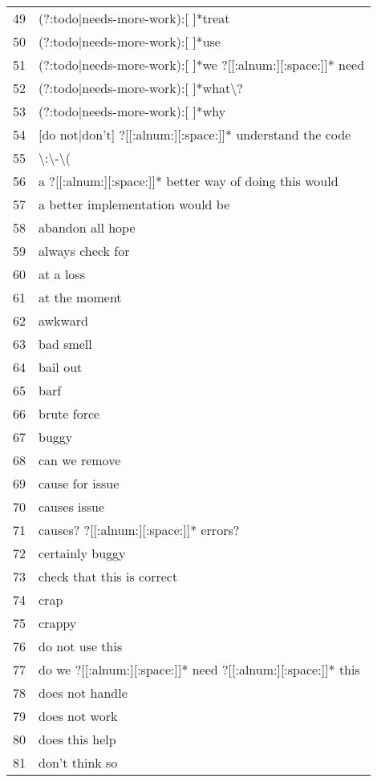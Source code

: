 \begin{longtable}{r|l}
49 & (?:todo|needs-more-work):[ ]*treat\\
50 & (?:todo|needs-more-work):[ ]*use\\
51 & (?:todo|needs-more-work):[ ]*we ?[[:alnum:][:space:]]* need\\
52 & (?:todo|needs-more-work):[ ]*what\textbackslash{}?\\
53 & (?:todo|needs-more-work):[ ]*why\\
54 & [do not|don't] ?[[:alnum:][:space:]]* understand the code\\
55 & \textbackslash{}:\textbackslash{}-\textbackslash{}(\\
56 & a ?[[:alnum:][:space:]]* better way of doing this would\\
57 & a better implementation would be\\
58 & abandon all hope\\
59 & always check for\\
60 & at a loss\\
61 & at the moment\\
62 & awkward\\
63 & bad smell\\
64 & bail out\\
65 & barf\\
66 & brute force\\
67 & buggy\\
68 & can we remove\\
69 & cause for issue\\
70 & causes issue\\
71 & causes? ?[[:alnum:][:space:]]* errors?\\
72 & certainly buggy\\
73 & check that this is correct\\
74 & crap\\
75 & crappy\\
76 & do not use this\\
77 & do we ?[[:alnum:][:space:]]* need ?[[:alnum:][:space:]]* this\\
78 & does not handle\\
79 & does not work\\
80 & does this help\\
81 & don't think so\\

\end{longtable}
